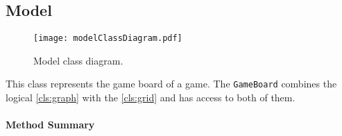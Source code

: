 \subsection{Model}

\begin{figure}[h]
	\centering
	\texttt{[image: modelClassDiagram.pdf]}
	\caption{Model class diagram.}
	\label{img:modelClassDiagram}
\end{figure}
\pagebreak

This class represents the game board of a game. The \texttt{GameBoard} combines the logical \ref{cls:graph} with the \ref{cls:grid} and has access to both of them. \\

\centerdash

\paragraph*{Method Summary}
